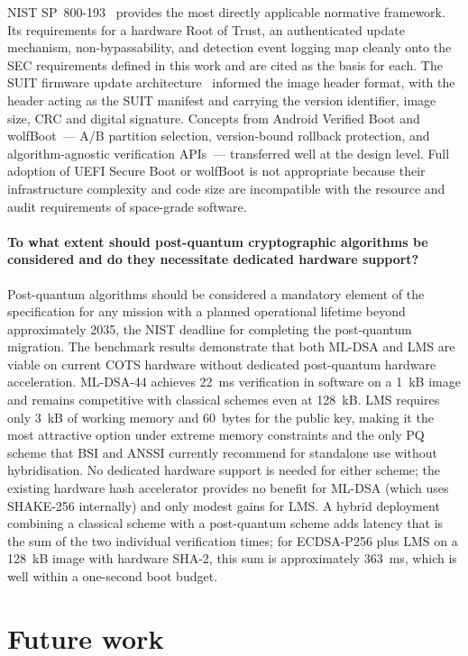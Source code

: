NIST SP~800-193~\cite{NIST-sp-800-193} provides the most directly applicable normative framework. Its requirements for a hardware Root of Trust, an authenticated update mechanism, non-bypassability, and detection event logging map cleanly onto the SEC requirements defined in this work and are cited as the basis for each. The SUIT firmware update architecture~\cite{rfc9019} informed the image header format, with the header acting as the SUIT manifest and carrying the version identifier, image size, CRC and digital signature. Concepts from Android Verified Boot and wolfBoot~--- A/B partition selection, version-bound rollback protection, and algorithm-agnostic verification APIs~--- transferred well at the design level. Full adoption of UEFI Secure Boot or wolfBoot is not appropriate because their infrastructure complexity and code size are incompatible with the resource and audit requirements of space-grade software.

\paragraph{To what extent should post-quantum cryptographic algorithms be considered and do they necessitate dedicated hardware support?}

Post-quantum algorithms should be considered a mandatory element of the specification for any mission with a planned operational lifetime beyond approximately 2035, the NIST deadline for completing the post-quantum migration. The benchmark results demonstrate that both ML-DSA and LMS are viable on current COTS hardware without dedicated post-quantum hardware acceleration. ML-DSA-44 achieves 22~ms verification in software on a 1~kB image and remains competitive with classical schemes even at 128~kB. LMS requires only 3~kB of working memory and 60~bytes for the public key, making it the most attractive option under extreme memory constraints and the only PQ scheme that BSI and ANSSI currently recommend for standalone use without hybridisation. No dedicated hardware support is needed for either scheme; the existing hardware hash accelerator provides no benefit for ML-DSA (which uses SHAKE-256 internally) and only modest gains for LMS. A hybrid deployment combining a classical scheme with a post-quantum scheme adds latency that is the sum of the two individual verification times; for ECDSA-P256 plus LMS on a 128~kB image with hardware SHA-2, this sum is approximately 363~ms, which is well within a one-second boot budget.


\section{Future work}
\label{section:conclusion-futureWork}

